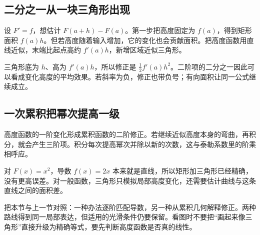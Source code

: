\subsection*{二分之一从一块三角形出现}
设 $F'=f$，想估计 $F(a+h)-F(a)$。第一步把高度固定为 $f(a)$，得到矩形面积 $f(a)h$。但若高度随着输入增加，它的变化也会贡献面积。把高度函数用直线近似，末端比起点高约 $f'(a)h$，新增区域近似三角形。

三角形底为 $h$、高为 $f'(a)h$，所以修正是 $\frac12 f'(a)h^2$。二阶项的二分之一因此可以看成变化高度的平均效果。若斜率为负，修正也带负号；有向面积让同一公式继续成立。

\subsection*{一次累积把幂次提高一级}
高度函数的一阶变化形成累积函数的二阶修正。若继续近似高度本身的弯曲，再积分，就会产生三阶项。积分每次提高幂次并除以新的次数，这与泰勒系数里的阶乘相呼应。

对 $F(x)=x^2$，导数 $f(x)=2x$ 本来就是直线，所以矩形加三角形已经精确，没有更高误差。对一般函数，三角形只模拟局部高度变化，还需要估计曲线与这条直线之间的面积差。

把本节与上一节对照：一种办法逐阶匹配导数，另一种从累积几何解释修正。两种路线得到同一局部表达，但适用的光滑条件仍要保留。看图时不要把“画起来像三角形”直接升级为精确等式，要先判断高度函数是否真的线性。
